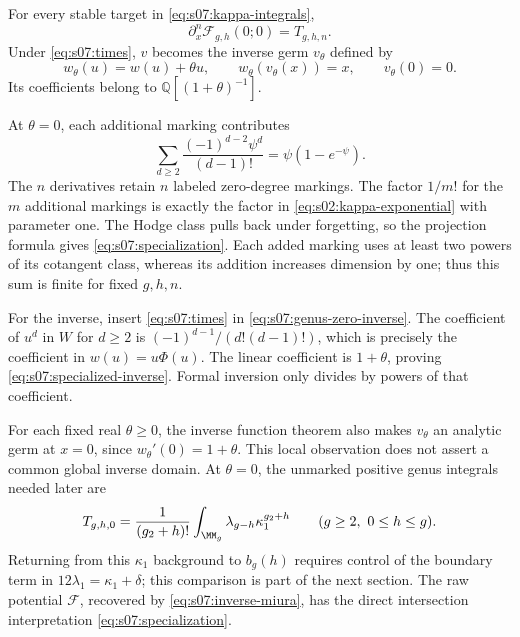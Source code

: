 \begin{prp}\label{prp:s07:specialization}
For every stable target in \eqref{eq:s07:kappa-integrals},
\begin{equation}\label{eq:s07:specialization}
 \partial_x^n\mathcal F_{g,h}(0;0)=T_{g,h,n}.
\end{equation}
Under \eqref{eq:s07:times}, $v$ becomes the inverse germ $v_\theta$
defined by
\begin{equation}\label{eq:s07:specialized-inverse}
 w_\theta(u)=w(u)+\theta u,\qquad
 w_\theta(v_\theta(x))=x,\qquad v_\theta(0)=0.
\end{equation}
Its coefficients belong to $\mathbb Q[(1+\theta)^{-1}]$.
\end{prp}
\begin{prf}
At $\theta=0$, each additional marking contributes
\begin{equation}\label{eq:s07:new-marking}
 \sum_{d\geq2}\frac{(-1)^{d-2}\psi^d}{(d-1)!}
                    =\psi(1-e^{-\psi}).
\end{equation}
The $n$ derivatives retain $n$ labeled zero-degree markings. The
factor $1/m!$ for the $m$ additional markings is exactly the factor
in \eqref{eq:s02:kappa-exponential} with parameter one. The Hodge
class pulls back under forgetting, so the projection formula gives
\eqref{eq:s07:specialization}. Each added marking uses at least
two powers of its cotangent class, whereas its addition increases
dimension by one; thus this sum is finite for fixed $g,h,n$.

For the inverse, insert \eqref{eq:s07:times} in
\eqref{eq:s07:genus-zero-inverse}. The coefficient of $u^d$ in
$W$ for $d\geq2$ is $(-1)^{d-1}/(d!(d-1)!)$, which is precisely
the coefficient in $w(u)=u\Phi(u)$. The linear coefficient is
$1+\theta$, proving \eqref{eq:s07:specialized-inverse}.
Formal inversion only divides by powers of that coefficient.
\end{prf}

For each fixed real $\theta\geq0$, the inverse function theorem
also makes $v_\theta$ an analytic germ at $x=0$, since
$w_\theta'(0)=1+\theta$. This local observation does not assert a
common global inverse domain. At $\theta=0$, the unmarked positive
genus integrals needed later are
\begin{equation}\label{eq:s07:unmarked}
 T_{g,h,0}
 =\frac1{(g_2+h)!}\int_{\MM_g}\lambda_{g-h}\kappa_1^{g_2+h}
       \qquad(g\geq2,\ 0\leq h\leq g).
\end{equation}
Returning from this $\kappa_1$ background to $b_g(h)$ requires control
of the boundary term in $12\lambda_1=\kappa_1+\delta$; this comparison
is part of the next section. The raw potential $\mathcal F$,
recovered by \eqref{eq:s07:inverse-miura}, has the direct intersection
interpretation \eqref{eq:s07:specialization}.
